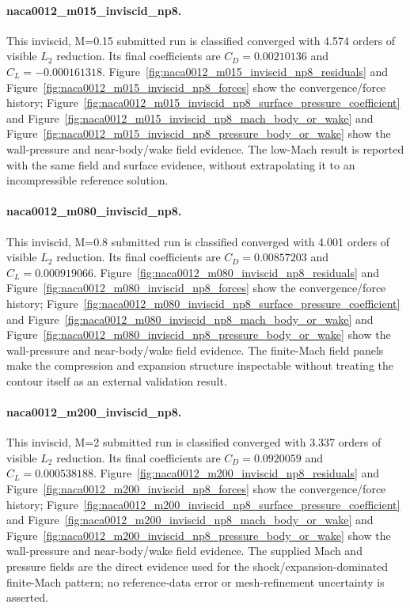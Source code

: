 \paragraph{naca0012\_m015\_inviscid\_np8.} This inviscid, M=0.15 submitted run is classified converged with 4.574 orders of visible $L_2$ reduction. Its final coefficients are $C_D=0.00210136$ and $C_L=-0.000161318$. Figure~\ref{fig:naca0012_m015_inviscid_np8_residuals} and Figure~\ref{fig:naca0012_m015_inviscid_np8_forces} show the convergence/force history; Figure~\ref{fig:naca0012_m015_inviscid_np8_surface_pressure_coefficient} and Figure~\ref{fig:naca0012_m015_inviscid_np8_mach_body_or_wake} and Figure~\ref{fig:naca0012_m015_inviscid_np8_pressure_body_or_wake} show the wall-pressure and near-body/wake field evidence. The low-Mach result is reported with the same field and surface evidence, without extrapolating it to an incompressible reference solution.
\paragraph{naca0012\_m080\_inviscid\_np8.} This inviscid, M=0.8 submitted run is classified converged with 4.001 orders of visible $L_2$ reduction. Its final coefficients are $C_D=0.00857203$ and $C_L=0.000919066$. Figure~\ref{fig:naca0012_m080_inviscid_np8_residuals} and Figure~\ref{fig:naca0012_m080_inviscid_np8_forces} show the convergence/force history; Figure~\ref{fig:naca0012_m080_inviscid_np8_surface_pressure_coefficient} and Figure~\ref{fig:naca0012_m080_inviscid_np8_mach_body_or_wake} and Figure~\ref{fig:naca0012_m080_inviscid_np8_pressure_body_or_wake} show the wall-pressure and near-body/wake field evidence. The finite-Mach field panels make the compression and expansion structure inspectable without treating the contour itself as an external validation result.
\paragraph{naca0012\_m200\_inviscid\_np8.} This inviscid, M=2 submitted run is classified converged with 3.337 orders of visible $L_2$ reduction. Its final coefficients are $C_D=0.0920059$ and $C_L=0.000538188$. Figure~\ref{fig:naca0012_m200_inviscid_np8_residuals} and Figure~\ref{fig:naca0012_m200_inviscid_np8_forces} show the convergence/force history; Figure~\ref{fig:naca0012_m200_inviscid_np8_surface_pressure_coefficient} and Figure~\ref{fig:naca0012_m200_inviscid_np8_mach_body_or_wake} and Figure~\ref{fig:naca0012_m200_inviscid_np8_pressure_body_or_wake} show the wall-pressure and near-body/wake field evidence. The supplied Mach and pressure fields are the direct evidence used for the shock/expansion-dominated finite-Mach pattern; no reference-data error or mesh-refinement uncertainty is asserted.
